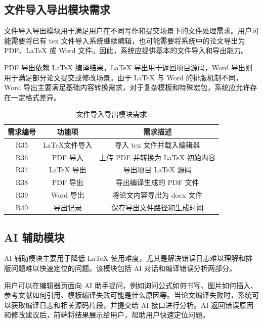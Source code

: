 \documentclass{xduugthesis}
\begin{document}
\subsection{文件导入导出模块需求}
文件导入导出模块用于满足用户在不同写作和提交场景下的文件处理需求。用户可能需要将已有 tex 文件导入系统继续编辑，也可能需要将系统中的论文导出为 PDF、LaTeX 或 Word 文件。因此，系统应提供基本的文件导入和导出能力。

PDF 导出依赖 LaTeX 编译结果，LaTeX 导出用于返回项目源码，Word 导出则用于满足部分论文提交或修改场景。由于 LaTeX 与 Word 的排版机制不同，Word 导出主要满足基础内容转换需求，对于复杂模板和特殊宏包，系统应允许存在一定格式差异。

\begin{table}[!ht]
    \centering
    \caption{文件导入导出模块需求}
    \label{tab:file-import-export-requirement}
    \begin{tabular}{|c|c|c|}
        \hline
        需求编号 & 功能项 & 需求描述 \\
        \hline
        R35 & LaTeX文件导入 & 导入 tex 文件并载入编辑器 \\
        \hline
        R36 & PDF 导入 & 上传 PDF 并转换为 LaTeX 初始内容 \\
        \hline
        R37 & LaTeX 导出 & 导出项目 LaTeX 源码 \\
        \hline
        R38 & PDF 导出 & 导出编译生成的 PDF 文件 \\
        \hline
        R39 & Word 导出 & 将论文内容导出为 docx 文件 \\
        \hline
        R40 & 导出记录 & 保存导出文件路径和生成时间 \\
        \hline
    \end{tabular}
\end{table}

\subsection{AI 辅助模块}
AI 辅助模块主要用于降低 LaTeX 使用难度，尤其是解决错误日志难以理解和排版问题难以快速定位的问题。该模块包括 AI 对话和编译错误分析两部分。

用户可以在编辑器页面向 AI 助手提问，例如询问公式如何书写、图片如何插入、参考文献如何引用、模板编译失败可能是什么原因等。当论文编译失败时，系统可以获取编译日志和相关源码片段，并提交给 AI 接口进行分析。AI 返回错误原因和修改建议后，前端将结果展示给用户，帮助用户快速定位问题。
\end{document}

